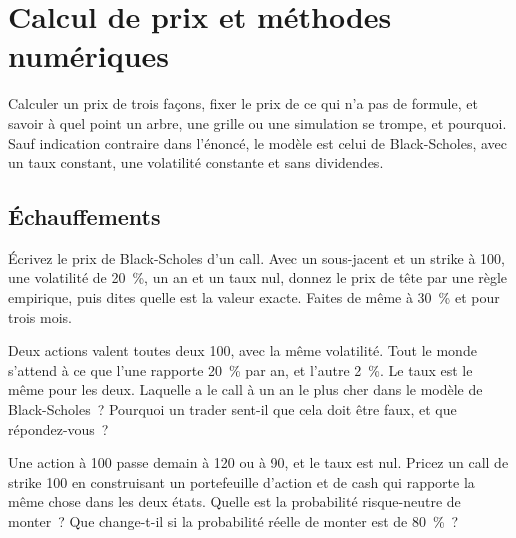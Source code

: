 \chapter{Calcul de prix et méthodes numériques}\label{ch:iv2:pricing-and-numerics}

\begin{ivtrains}
Calculer un prix de trois façons, fixer le prix de ce qui n'a pas de formule, et savoir à quel point un arbre, une grille ou une simulation se trompe, et pourquoi. Sauf indication contraire dans l'énoncé, le modèle est celui de Black-Scholes, avec un taux constant, une volatilité constante et sans dividendes.
\end{ivtrains}

\section{Échauffements}

\begin{question}\label{iq:iv2:pricing-and-numerics:1}
Écrivez le prix de Black-Scholes d'un call. Avec un sous-jacent et un strike à 100, une volatilité de 20~\%, un an et un taux nul, donnez le prix de tête par une règle empirique, puis dites quelle est la valeur exacte. Faites de même à 30~\% et pour trois mois.
\end{question}

\begin{question}\label{iq:iv2:pricing-and-numerics:2}
Deux actions valent toutes deux 100, avec la même volatilité. Tout le monde s'attend à ce que l'une rapporte 20~\% par an, et l'autre 2~\%. Le taux est le même pour les deux. Laquelle a le call à un an le plus cher dans le modèle de Black-Scholes~? Pourquoi un trader sent-il que cela doit être faux, et que répondez-vous~?
\end{question}

\begin{question}\label{iq:iv2:pricing-and-numerics:3}
Une action à 100 passe demain à 120 ou à 90, et le taux est nul. Pricez un call de strike 100 en construisant un portefeuille d'action et de cash qui rapporte la même chose dans les deux états. Quelle est la probabilité risque-neutre de monter~? Que change-t-il si la probabilité réelle de monter est de 80~\%~?
\end{question}

